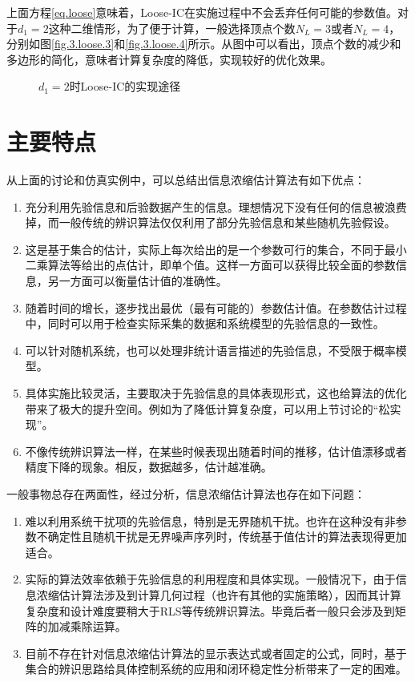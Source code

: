 上面方程\eqref{eq.loose}意味着，Loose-IC在实施过程中不会丢弃任何可能的参数值。对于$d_{1}=2$这种二维情形，为了便于计算，一般选择顶点个数$N_{L}=3$或者$N_{L}=4$，分别如图\ref{fig.3.loose.3}和\ref{fig.3.loose.4}所示。从图中可以看出，顶点个数的减少和多边形的简化，意味者计算复杂度的降低，实现较好的优化效果。

\begin{figure}[!h]
	\centering
	\caption{$d_{1}=2$时Loose-IC的实现途径}	 %
	\label{fig.3.loose}	 %
\end{figure}

\section{主要特点}\label{sect:3.6}
从上面的讨论和仿真实例中，可以总结出信息浓缩估计算法有如下优点：
\begin{enumerate}
\item 充分利用先验信息和后验数据产生的信息。理想情况下没有任何的信息被浪费掉，而一般传统的辨识算法仅仅利用了部分先验信息和某些随机先验假设。
\item 这是基于集合的估计，实际上每次给出的是一个参数可行的集合，不同于最小二乘算法等给出的点估计，即单个值。这样一方面可以获得比较全面的参数信息，另一方面可以衡量估计值的准确性。
\item 随着时间的增长，逐步找出最优（最有可能的）参数估计值。在参数估计过程中，同时可以用于检查实际采集的数据和系统模型的先验信息的一致性。
\item 可以针对随机系统，也可以处理非统计语言描述的先验信息，不受限于概率模型。
\item 具体实施比较灵活，主要取决于先验信息的具体表现形式，这也给算法的优化带来了极大的提升空间。例如为了降低计算复杂度，可以用上节讨论的“松实现”。
\item 不像传统辨识算法一样，在某些时候表现出随着时间的推移，估计值漂移或者精度下降的现象。相反，数据越多，估计越准确。
\end{enumerate}

一般事物总存在两面性，经过分析，信息浓缩估计算法也存在如下问题：
\begin{enumerate}
\item 难以利用系统干扰项的先验信息，特别是无界随机干扰。也许在这种没有非参数不确定性且随机干扰是无界噪声序列时，传统基于值估计的算法表现得更加适合。
\item 实际的算法效率依赖于先验信息的利用程度和具体实现。一般情况下，由于信息浓缩估计算法涉及到计算几何过程（也许有其他的实施策略），因而其计算复杂度和设计难度要稍大于RLS等传统辨识算法。毕竟后者一般只会涉及到矩阵的加减乘除运算。
\item 目前不存在针对信息浓缩估计算法的显示表达式或者固定的公式，同时，基于集合的辨识思路给具体控制系统的应用和闭环稳定性分析带来了一定的困难。
\end{enumerate}

